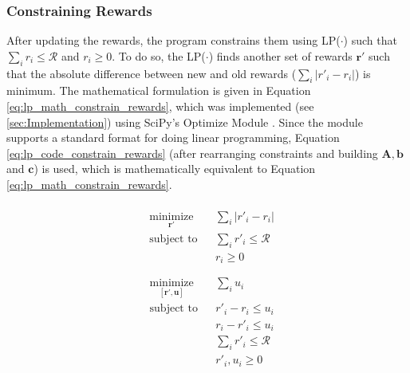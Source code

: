 \documentclass[12pt]{article}
\newcommand{\vect}[1]{\mathbf{#1}}  %
\newcommand{\matr}[1]{\mathbf{#1}}  %
\begin{document}
    \subsubsection{Constraining Rewards} \label{sec:Constraining Rewards}
    After updating the rewards, the program constrains them using LP($\cdot$) such that $\sum_{i}r_i \leq \mathcal{R}$ and $r_i \geq 0$. To do so, the LP($\cdot$) finds another set of rewards $\vect{r'}$ such that the absolute difference between new and old rewards ($\sum_{i}|r'_i - r_i|$) is minimum. The mathematical formulation is given in Equation \ref{eq:lp_math_constrain_rewards}, which was implemented (see \cref{sec:Implementation}) using SciPy's Optimize Module \cite{SCPOptimizeDocs}. Since the module supports a standard format for doing linear programming, Equation \ref{eq:lp_code_constrain_rewards} (after rearranging constraints and building $\matr{A}, \vect{b}$ and $\vect{c}$) is used, which is mathematically equivalent to Equation \ref{eq:lp_math_constrain_rewards}.
    \begin{multicols}{2}
        \begin{equation} \label{eq:lp_math_constrain_rewards}
            \begin{aligned}\\
                & \underset{\vect{r'}}{\text{minimize}}
                & & \sum_{i}|r'_i - r_i|\\
                & \text{subject to}
                & & \sum_{i}r'_i \leq \mathcal{R}\\
                &&& r_i \geq 0\\ \\
            \end{aligned}
        \end{equation}\break
        \begin{equation} \label{eq:lp_code_constrain_rewards}
            \begin{aligned}
                & \underset{[\vect{r'}, \vect{u}]}{\text{minimize}}
                & & \sum_{i} u_i\\
                & \text{subject to}
                & & r'_i - r_i \leq u_i\\
                &&& r_i - r'_i \leq u_i\\
                &&& \sum_{i} r'_i \leq \mathcal{R}\\
                &&& r'_i, u_i \geq 0
            \end{aligned}
        \end{equation}
    \end{multicols}
    
\end{document}
